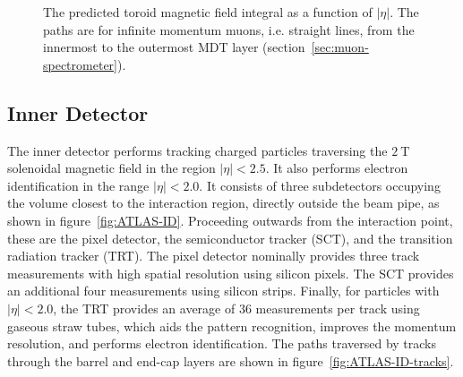 \begin{figure}[htbp]
	\centering
	\caption{The predicted toroid magnetic field integral as a function of $|\eta|$. The paths are for infinite momentum muons, i.e. straight lines, from the innermost to the outermost MDT layer (section~\ref{sec:muon-spectrometer}).}
	\label{fig:ATLAS-toroid-Bintegral}
\end{figure}



\subsection{Inner Detector}\label{sec:ATLAS-inner-detector}

The inner detector performs tracking charged particles traversing the $2~\mbox{T}$ solenoidal magnetic field in the region $|\eta|<2.5$. It also performs electron identification in the range $|\eta|<2.0$. It consists of three subdetectors occupying the volume closest to the interaction region, directly outside the beam pipe, as shown in figure~\ref{fig:ATLAS-ID}. Proceeding outwards from the interaction point, these are the pixel detector, the semiconductor tracker (SCT), and the transition radiation tracker (TRT). The pixel detector nominally provides three track measurements with high spatial resolution using silicon pixels. The SCT provides an additional four measurements using silicon strips. Finally, for particles with $|\eta|<2.0$, the TRT provides an average of 36 measurements per track using gaseous straw tubes, which aids the pattern recognition, improves the momentum resolution, and performs electron identification. The paths traversed by tracks through the barrel and end-cap layers are shown in figure~\ref{fig:ATLAS-ID-tracks}.

